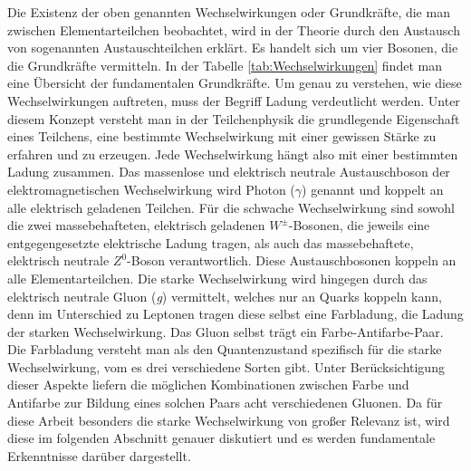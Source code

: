 \documentclass[12pt,a4paper]{report}
\begin{document}
\hspace{-0.15cm}Die Existenz der oben genannten Wechselwirkungen oder Grundkräfte, die man zwischen Elementarteilchen beobachtet, wird in der Theorie durch den Austausch von sogenannten Austauschteilchen erklärt. Es handelt sich um vier Bosonen, die die Grundkräfte vermitteln. In der Tabelle \ref{tab:Wechselwirkungen} findet man eine Übersicht der fundamentalen Grundkräfte. Um genau zu verstehen, wie diese Wechselwirkungen auftreten, muss der Begriff \glqq Ladung\grqq{} verdeutlicht werden. Unter diesem Konzept versteht man in der Teilchenphysik die grundlegende Eigenschaft eines Teilchens, eine bestimmte Wechselwirkung mit einer gewissen Stärke zu erfahren und zu erzeugen. Jede Wechselwirkung hängt also mit einer bestimmten Ladung zusammen. Das massenlose und elektrisch neutrale Austauschboson der elektromagnetischen Wechselwirkung wird Photon ($\gamma$) genannt und koppelt an alle elektrisch geladenen Teilchen. Für die schwache Wechselwirkung sind sowohl die zwei massebehafteten, elektrisch geladenen $W^{\pm}$-Bosonen, die jeweils eine entgegengesetzte elektrische Ladung tragen, als auch das massebehaftete, elektrisch neutrale $Z^{0}$-Boson verantwortlich. Diese Austauschbosonen koppeln an alle Elementarteilchen. Die starke Wechselwirkung wird hingegen durch das elektrisch neutrale Gluon (\textit{g}) vermittelt, welches nur an Quarks koppeln kann, denn im Unterschied zu Leptonen tragen diese selbst eine Farbladung, die Ladung der starken Wechselwirkung. Das Gluon selbst trägt ein Farbe-Antifarbe-Paar. Die Farbladung versteht man als den Quantenzustand spezifisch für die starke Wechselwirkung, vom es drei verschiedene Sorten gibt. Unter Berücksichtigung dieser Aspekte liefern die möglichen Kombinationen zwischen Farbe und Antifarbe zur Bildung eines solchen Paars acht verschiedenen Gluonen. Da für diese Arbeit besonders die starke Wechselwirkung von großer Relevanz ist, wird diese im folgenden Abschnitt genauer diskutiert und es werden fundamentale Erkenntnisse darüber dargestellt.
\end{document}
